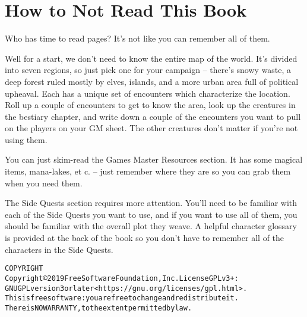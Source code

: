 \section*{How to Not Read This Book}

\begin{multicols}{2}

\noindent Who has time to read \pageref{lastpage} pages?  It's not like you can remember all of them.

Well for a start, we don't need to know the entire map of the world.
It's divided into seven regions, so just pick one for your campaign -- there's snowy waste, a deep forest ruled mostly by elves, islands, and a more urban area full of political upheaval.
Each has a unique set of encounters which characterize the location.
Roll up a couple of encounters to get to know the area, look up the creatures in the bestiary chapter, and write down a couple of the encounters you want to pull on the players on your GM sheet.
The other creatures don't matter if you're not using them.

You can just skim-read the Games Master Resources section.
It has some magical items, mana-lakes, et c. -- just remember where they are so you can grab them when you need them.

The Side Quests section requires more attention.
You'll need to be familiar with each of the Side Quests you want to use, and if you want to use all of them, you should be familiar with the overall plot they weave.
A helpful character glossary is provided at the back of the book so you don't have to remember all of the characters in the Side Quests.

\end{multicols}

\begin{alltt}
COPYRIGHT
       Copyright \copyright 2019 Free Software Foundation, Inc.  License GPLv3+:
	GNU GPL version 3 or later <https://gnu.org/licenses/gpl.html>.
       This is free software: you are free to change and redistribute it.
	There is NO WARRANTY, to the extent permitted by law.

\end{alltt}
